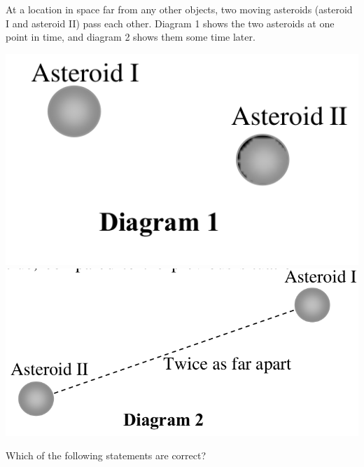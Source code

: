 \documentclass[12pt]{exam}
\begin{document}
\begin{questions}

\question At a location in space far from any other objects, two moving asteroids (asteroid I and asteroid II) pass each other. Diagram 1 shows the two asteroids at one point in time, and diagram 2 shows them some time later.
\begin{center}
\includegraphics[scale=0.25]{../images/asteroids1.png} \hspace{0.5in} \includegraphics[scale=0.25]{../images/asteroids2.png}
\end{center}
Which of the following statements are correct?
\begin{parts}

\end{parts}
\end{questions}
\end{document}
